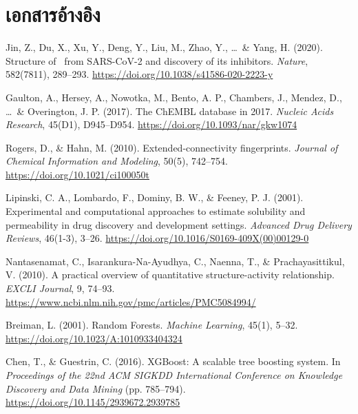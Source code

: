 \chapter*{เอกสารอ้างอิง}

\begin{enumerate}[leftmargin=2.2em, itemsep=0.75em, label={[\arabic*]}]

\item Jin, Z., Du, X., Xu, Y., Deng, Y., Liu, M., Zhao, Y., \ldots\ \& Yang, H. (2020). Structure of \Mpro\ from SARS-CoV-2 and discovery of its inhibitors. \textit{Nature}, 582(7811), 289--293. \url{https://doi.org/10.1038/s41586-020-2223-y}

\item Gaulton, A., Hersey, A., Nowotka, M., Bento, A. P., Chambers, J., Mendez, D., \ldots\ \& Overington, J. P. (2017). The ChEMBL database in 2017. \textit{Nucleic Acids Research}, 45(D1), D945--D954. \url{https://doi.org/10.1093/nar/gkw1074}

\item Rogers, D., \& Hahn, M. (2010). Extended-connectivity fingerprints. \textit{Journal of Chemical Information and Modeling}, 50(5), 742--754. \url{https://doi.org/10.1021/ci100050t}

\item Lipinski, C. A., Lombardo, F., Dominy, B. W., \& Feeney, P. J. (2001). Experimental and computational approaches to estimate solubility and permeability in drug discovery and development settings. \textit{Advanced Drug Delivery Reviews}, 46(1-3), 3--26. \url{https://doi.org/10.1016/S0169-409X(00)00129-0}

\item Nantasenamat, C., Isarankura-Na-Ayudhya, C., Naenna, T., \& Prachayasittikul, V. (2010). A practical overview of quantitative structure-activity relationship. \textit{EXCLI Journal}, 9, 74--93. \url{https://www.ncbi.nlm.nih.gov/pmc/articles/PMC5084994/}

\item Breiman, L. (2001). Random Forests. \textit{Machine Learning}, 45(1), 5--32. \url{https://doi.org/10.1023/A:1010933404324}

\item Chen, T., \& Guestrin, C. (2016). XGBoost: A scalable tree boosting system. In \textit{Proceedings of the 22nd ACM SIGKDD International Conference on Knowledge Discovery and Data Mining} (pp. 785--794). \url{https://doi.org/10.1145/2939672.2939785}


\end{enumerate}

